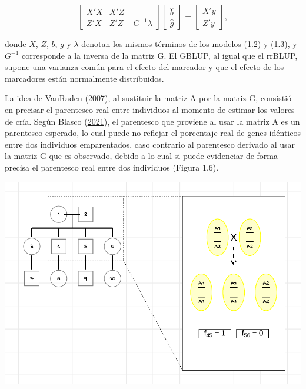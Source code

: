 \documentclass[11pt,spanish,a4paper,oneside,]{book} %
\begin{document}
\begin{equation}
\begin{bmatrix}
X'X & X'Z \\
Z'X & Z'Z + G^{-1} \lambda
\end{bmatrix}
\begin{bmatrix}
\hat{b} \\
\hat{g}
\end{bmatrix}
=
\begin{bmatrix}
X'y \\
Z'y
\end{bmatrix}
,
\end{equation}

donde \(X\), \(Z\), \(b\), \(g\) y \(\lambda\) denotan los mismos términos de los modelos (1.2) y (1.3), y \(G^{-1}\) corresponde a la inversa de la matriz G. El GBLUP, al igual que el rrBLUP, supone una varianza común para el efecto del marcador y que el efecto de los marcadores están normalmente distribuidos.

La idea de VanRaden (\protect\hyperlink{ref-cite:39}{2007}), al sustituir la matriz A por la matriz G, consistió en precisar el parentesco real entre individuos al momento de estimar los valores de cría. Según Blasco (\protect\hyperlink{ref-cite:21}{2021}), el parentesco que proviene al usar la matriz A es un parentesco esperado, lo cual puede no reflejar el porcentaje real de genes idénticos entre dos individuos emparentados, caso contrario al parentesco derivado al usar la matriz G que es observado, debido a lo cual si puede evidenciar de forma precisa el parentesco real entre dos individuos (Figura 1.6).

\begin{center}\includegraphics[width=1\linewidth]{figures/Ped} \end{center}
\end{document}
